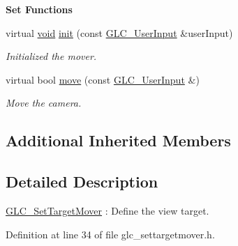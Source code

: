 \begin{Indent}{\bf Set Functions}\par
\begin{DoxyCompactItemize}
\item 
virtual \hyperlink{group___u_a_v_objects_plugin_ga444cf2ff3f0ecbe028adce838d373f5c}{void} \hyperlink{class_g_l_c___set_target_mover_a7e6220d9f05cbaf4eb701a7e6cb68c9c}{init} (const \hyperlink{class_g_l_c___user_input}{G\-L\-C\-\_\-\-User\-Input} \&user\-Input)
\begin{DoxyCompactList}\small\item\em Initialized the mover. \end{DoxyCompactList}\item 
virtual bool \hyperlink{class_g_l_c___set_target_mover_a88bcb1421a004dfdca72ea4f448b85b4}{move} (const \hyperlink{class_g_l_c___user_input}{G\-L\-C\-\_\-\-User\-Input} \&)
\begin{DoxyCompactList}\small\item\em Move the camera. \end{DoxyCompactList}\end{DoxyCompactItemize}
\end{Indent}
\subsection*{Additional Inherited Members}


\subsection{Detailed Description}
\hyperlink{class_g_l_c___set_target_mover}{G\-L\-C\-\_\-\-Set\-Target\-Mover} \-: Define the view target. 

Definition at line 34 of file glc\-\_\-settargetmover.\-h.



